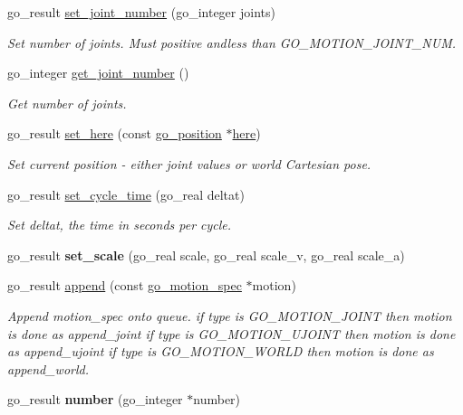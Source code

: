 \begin{DoxyCompactItemize}
\item 
go\-\_\-result \hyperlink{structgomotion_1_1go__motion__queue_ac623c003c01542bea2151f38b622c67e}{set\-\_\-joint\-\_\-number} (go\-\_\-integer joints)
\begin{DoxyCompactList}\small\item\em Set number of joints. Must positive andless than G\-O\-\_\-\-M\-O\-T\-I\-O\-N\-\_\-\-J\-O\-I\-N\-T\-\_\-\-N\-U\-M. \end{DoxyCompactList}\item 
go\-\_\-integer \hyperlink{structgomotion_1_1go__motion__queue_ac2fcc83c90ccd7794d7407174eaf2b37}{get\-\_\-joint\-\_\-number} ()
\begin{DoxyCompactList}\small\item\em Get number of joints. \end{DoxyCompactList}\item 
go\-\_\-result \hyperlink{structgomotion_1_1go__motion__queue_a0580645d22f2db0893ccd1cc0271469d}{set\-\_\-here} (const \hyperlink{structgomotion_1_1go__position}{go\-\_\-position} $\ast$\hyperlink{structgomotion_1_1go__motion__queue_ab45a3644aac5d496e758db38a3553037}{here})
\begin{DoxyCompactList}\small\item\em Set current position -\/ either joint values or world Cartesian pose. \end{DoxyCompactList}\item 
go\-\_\-result \hyperlink{structgomotion_1_1go__motion__queue_a560b24166fe53f8e2d8be6afaf08c7e9}{set\-\_\-cycle\-\_\-time} (go\-\_\-real deltat)
\begin{DoxyCompactList}\small\item\em Set deltat, the time in seconds per cycle. \end{DoxyCompactList}\item 
\hypertarget{structgomotion_1_1go__motion__queue_addfc802fee86a93050de27d185c4030b}{go\-\_\-result {\bfseries set\-\_\-scale} (go\-\_\-real scale, go\-\_\-real scale\-\_\-v, go\-\_\-real scale\-\_\-a)}\label{structgomotion_1_1go__motion__queue_addfc802fee86a93050de27d185c4030b}

\item 
go\-\_\-result \hyperlink{structgomotion_1_1go__motion__queue_aed6b10eacd99af71b2b0cf69d6ddebeb}{append} (const \hyperlink{structgomotion_1_1go__motion__spec}{go\-\_\-motion\-\_\-spec} $\ast$motion)
\begin{DoxyCompactList}\small\item\em Append motion\-\_\-spec onto queue. if type is G\-O\-\_\-\-M\-O\-T\-I\-O\-N\-\_\-\-J\-O\-I\-N\-T then motion is done as append\-\_\-joint if type is G\-O\-\_\-\-M\-O\-T\-I\-O\-N\-\_\-\-U\-J\-O\-I\-N\-T then motion is done as append\-\_\-ujoint if type is G\-O\-\_\-\-M\-O\-T\-I\-O\-N\-\_\-\-W\-O\-R\-L\-D then motion is done as append\-\_\-world. \end{DoxyCompactList}\item 
\hypertarget{structgomotion_1_1go__motion__queue_a8dfbc19656f2dfcf1e99c27e6a909c4d}{go\-\_\-result {\bfseries number} (go\-\_\-integer $\ast$number)}\label{structgomotion_1_1go__motion__queue_a8dfbc19656f2dfcf1e99c27e6a909c4d}


\end{DoxyCompactItemize}
